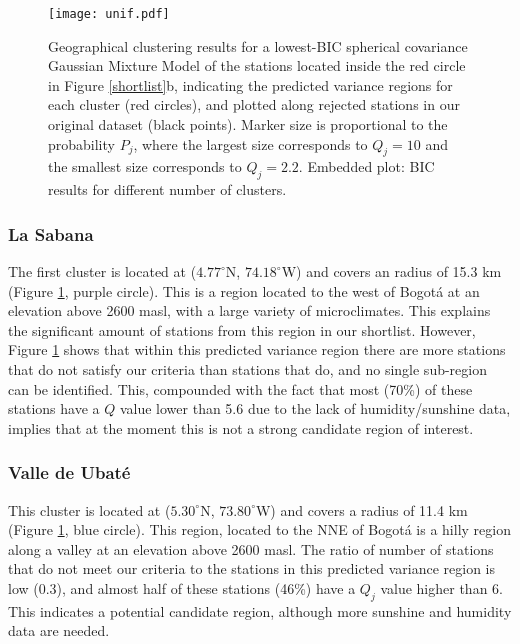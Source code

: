 \documentclass[12pt]{iopart}
\begin{document}
\begin{figure}
\begin{center}
\texttt{[image: unif.pdf]}
\caption{Geographical clustering results  for a lowest-BIC spherical covariance Gaussian Mixture Model of the stations located inside the red circle in Figure \ref{shortlist}b, indicating the predicted variance regions for each cluster (red circles), and plotted along rejected stations in our original dataset (black points). Marker size is proportional to the probability $P_j$, where the largest size corresponds to  $Q_j=10$ and the smallest size corresponds to $Q_j=2.2$. Embedded plot: BIC results for different number of clusters. }\label{unif}
\end{center}
\end{figure}


\subsubsection{La Sabana}

The first cluster is located at ($4.77^\circ$N, $74.18^\circ$W) and covers an radius of 15.3 km (Figure \ref{unif}, purple circle). This is a region located to the west of Bogot\'a at an elevation above 2600 masl, with a large variety of microclimates. This explains the significant amount of stations from this region in our shortlist. However, Figure \ref{unif} shows that within this predicted variance region there are more stations that do not satisfy our criteria than stations that do, and no single sub-region can be identified. This, compounded with the fact that most (70\%) of these stations have a $Q$ value lower than 5.6 due to the lack of humidity/sunshine data, implies that at the moment this is not a strong candidate region of interest.


\subsubsection{Valle de Ubat\'e}

This cluster is located at ($5.30^\circ$N, $73.80^\circ$W) and covers a radius of 11.4 km (Figure \ref{unif}, blue circle). This region, located to the NNE of Bogot\'a is a hilly region along a valley at an elevation above 2600 masl. The ratio of number of stations that do not meet our criteria to the stations in this predicted variance region is low (0.3), and almost half of these stations (46\%) have a $Q_j$ value higher than 6. This indicates a potential candidate region, although more  sunshine and humidity data are needed.
\end{document}

